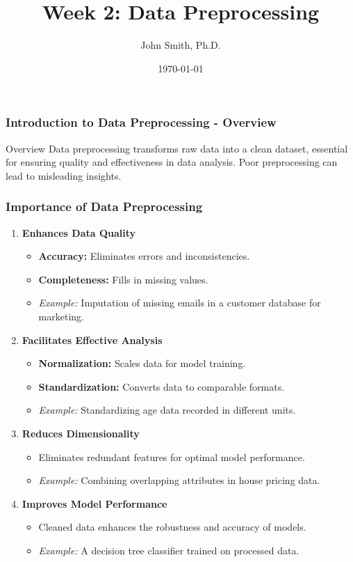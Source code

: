 \documentclass[aspectratio=169]{beamer}
\title[Data Preprocessing]{Week 2: Data Preprocessing}
\author[John Smith]{John Smith, Ph.D.}
\institute[University Name]{
  Department of Computer Science\\
  University Name\\
  \vspace{0.3cm}
  Email: email@university.edu\\
  Website: www.university.edu
}
\date{\today}
\begin{document}
\frame{\titlepage}

\begin{frame}[fragile]
    \frametitle{Introduction to Data Preprocessing - Overview}
    \begin{block}{Overview}
        Data preprocessing transforms raw data into a clean dataset, essential for ensuring quality and effectiveness in data analysis. Poor preprocessing can lead to misleading insights.
    \end{block}
\end{frame}

\begin{frame}[fragile]
    \frametitle{Importance of Data Preprocessing}
    \begin{enumerate}
        \item \textbf{Enhances Data Quality}
        \begin{itemize}
            \item \textbf{Accuracy:} Eliminates errors and inconsistencies.
            \item \textbf{Completeness:} Fills in missing values.
            \item \textit{Example:} Imputation of missing emails in a customer database for marketing.
        \end{itemize}
        
        \item \textbf{Facilitates Effective Analysis}
        \begin{itemize}
            \item \textbf{Normalization:} Scales data for model training.
            \item \textbf{Standardization:} Converts data to comparable formats.
            \item \textit{Example:} Standardizing age data recorded in different units.
        \end{itemize}
        
        \item \textbf{Reduces Dimensionality}
        \begin{itemize}
            \item Eliminates redundant features for optimal model performance.
            \item \textit{Example:} Combining overlapping attributes in house pricing data.
        \end{itemize}
        
        \item \textbf{Improves Model Performance}
        \begin{itemize}
            \item Cleaned data enhances the robustness and accuracy of models.
            \item \textit{Example:} A decision tree classifier trained on processed data.
        \end{itemize}
    \end{enumerate}
\end{frame}
\end{document}
